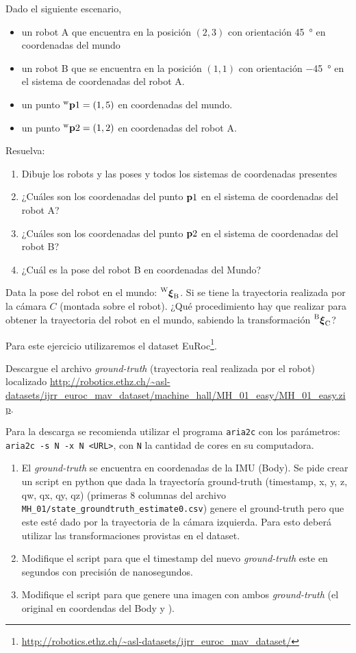 \documentclass[tp]{lcc}
\begin{document}
\ejercicio Dado el siguiente escenario,
\begin{itemize}
    \item un robot A que encuentra en la posición $(2,3)$ con orientación \SI{45}{\degree} en coordenadas del mundo
    \item un robot B que se encuentra en la posición $(1,1)$ con orientación \SI{-45}{\degree} en el sistema de coordenadas del robot A.
    \item un punto $\prescript{\mathrm{\mathrm{w}}}{}{\boldsymbol{\mathbf{p}}}1 = (1,5)$ en coordenadas del mundo.
    \item un punto $\prescript{\mathrm{\mathrm{w}}}{}{\boldsymbol{\mathbf{p}}}2 = (1,2)$ en coordenadas del robot A.
\end{itemize}
Resuelva:
\begin{enumerate}
    \item Dibuje los robots y las poses y todos los sistemas de coordenadas presentes
    \item ¿Cuáles son los coordenadas del punto $\boldsymbol{\mathbf{p}}1$ en el sistema de coordenadas del robot A?
    \item ¿Cuáles son los coordenadas del punto $\boldsymbol{\mathbf{p}}2$ en el sistema de coordenadas del robot B?
    \item ¿Cuál es la pose del robot B en coordenadas del Mundo?
\end{enumerate}

\ejercicio Data la pose del robot en el mundo: $\prescript{\mathrm{W}}{}{{\boldsymbol{\mathbf{\xi}}}_\mathrm{B}}$. Si se tiene la trayectoria realizada por la cámara $C$ (montada sobre el robot). ¿Qué procedimiento hay que realizar para obtener la trayectoria del robot en el mundo, sabiendo la transformación $\prescript{\mathrm{B}}{}{{\boldsymbol{\mathbf{\xi}}}_\mathrm{C}}$?

\ejercicio Para este ejercicio utilizaremos el dataset EuRoc\footnote{\url{http://robotics.ethz.ch/~asl-datasets/ijrr_euroc_mav_dataset/}}.

Descargue el archivo \emph{ground-truth} (trayectoria real realizada por el robot) localizado \url{ http://robotics.ethz.ch/~asl-datasets/ijrr_euroc_mav_dataset/machine_hall/MH_01_easy/MH_01_easy.zip}.

\nota Para la descarga se recomienda utilizar el programa \lstinline{aria2c} con los parámetros: \lstinline{aria2c -s N -x N <URL>}, con \lstinline{N} la cantidad de cores en su computadora.

\begin{enumerate}
    \item El \emph{ground-truth} se encuentra en coordenadas de la IMU (Body). Se pide crear un script en python que dada la trayectoría ground-truth (timestamp, x, y, z, qw, qx, qy, qz) (primeras 8 columnas del archivo \lstinline{MH_01/state_groundtruth_estimate0.csv}) genere el ground-truth pero que este esté dado por la trayectoria de la cámara izquierda. Para esto deberá utilizar las transformaciones provistas en el dataset.
    
    \item Modifique el script para que el timestamp del nuevo \emph{ground-truth} este en segundos con precisión de nanosegundos.
    
    \item Modifique el script para que genere una imagen con ambos \emph{ground-truth} (el original en coordendas del Body y ).
\end{enumerate}
\end{document}
